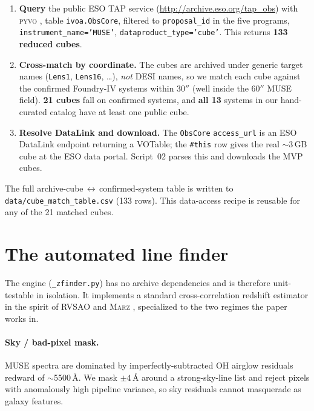 \documentclass[11pt,letterpaper]{article}
\newcommand{\muse}{\textsc{MUSE}}
\begin{document}
\begin{enumerate}
\item \textbf{Query} the public ESO TAP service
      (\url{http://archive.eso.org/tap_obs}) with \textsc{pyvo}
      \autocite{pyvo}, table \texttt{ivoa.ObsCore}, filtered to
      \texttt{proposal\_id} in the five programs, \texttt{instrument\_name='MUSE'},
      \texttt{dataproduct\_type='cube'}. This returns \textbf{133 reduced cubes}.
\item \textbf{Cross-match by coordinate.} The cubes are archived under generic
      target names (\texttt{Lens1}, \texttt{Lens16}, \ldots), \emph{not} DESI
      names, so we match each cube against the confirmed Foundry-IV systems within
      $30''$ (well inside the $60''$ \muse{} field). \textbf{21 cubes} fall on
      confirmed systems, and \textbf{all 13} systems in our hand-curated catalog
      have at least one public cube.
\item \textbf{Resolve DataLink and download.} The \texttt{ObsCore}
      \texttt{access\_url} is an ESO DataLink endpoint returning a VOTable; the
      \texttt{\#this} row gives the real $\sim$3\,GB cube at the ESO data portal.
      Script~02 parses this and downloads the MVP cubes.
\end{enumerate}
The full archive-cube\,$\leftrightarrow$\,confirmed-system table is written to
\texttt{data/cube\_match\_table.csv} (133 rows). This data-access recipe is
reusable for any of the 21 matched cubes.

\section{The automated line finder}

The engine (\texttt{\_zfinder.py}) has no archive dependencies and is therefore
unit-testable in isolation. It implements a standard cross-correlation redshift
estimator in the spirit of \textsc{RVSAO} \autocite{kurtz1998rvsao} and
\textsc{Marz} \autocite{hinton2016marz}, specialized to the two regimes the
paper works in.

\paragraph{Sky / bad-pixel mask.} \muse{} spectra are dominated by
imperfectly-subtracted OH airglow residuals redward of $\sim$5500\,\AA. We mask
$\pm 4$\,\AA{} around a strong-sky-line list and reject pixels with anomalously
high pipeline variance, so sky residuals cannot masquerade as galaxy features.
\end{document}

